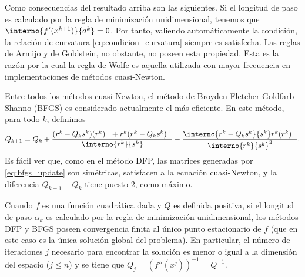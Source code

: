 Como consecuencias del resultado arriba son las siguientes. Si el longitud de paso es calculado por la regla de minimización unidimensional, tenemos que $\interno{f'(x^{k+1})}{d^k} = 0$. Por tanto, valiendo automáticamente la condición, la relación de curvatura \eqref{eq:condicion_curvatura} siempre es satisfecha. Las reglas de Armijo y de Goldstein, no obstante, no poseen esta propiedad. Esta es la razón por la cual la regla de Wolfe es aquella utilizada con mayor frecuencia en implementaciones de métodos cuasi-Newton.

Entre todos los métodos cuasi-Newton, el método de Broyden-Fletcher-Goldfarb-Shanno (BFGS) es considerado actualmente el más eficiente. En este método, para todo $k$, definimos
\begin{equation}
    Q_{k+1} = Q_k + \frac{(r^k - Q_k s^k)(r^k)^\top + r^k(r^k - Q_k s^k)^\top}{\interno{r^k}{s^k}} - \frac{\interno{r^k - Q_k s^k}{s^k} r^k (r^k)^\top}{\interno{r^k}{s^k}^2}.
    \label{eq:bfgs_update}
\end{equation}
Es fácil ver que, como en el método DFP, las matrices generadas por \eqref{eq:bfgs_update} son simétricas, satisfacen a la ecuación cuasi-Newton, y la diferencia $Q_{k+1} - Q_k$ tiene puesto 2, como máximo.

Cuando $f$ es una función cuadrática dada y $Q$ es definida positiva, si el longitud de paso $\alpha_k$ es calculado por la regla de minimización unidimensional, los métodos DFP y BFGS poseen convergencia finita al único punto estacionario de $f$ (que en este caso es la única solución global del problema). En particular, el número de iteraciones $j$ necesario para encontrar la solución es menor o igual a la dimensión del espacio ($j \le n$) y se tiene que $Q_j = (f''(x^j))^{-1} = Q^{-1}$.